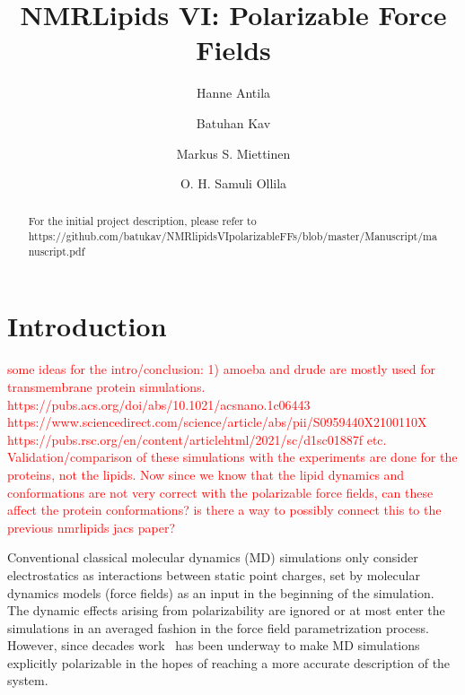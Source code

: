 \documentclass[journal=jacsat,manuscript=article,layout=singlecolumn]{achemso}
\author{Hanne Antila}
\author{Batuhan Kav}
\affiliation{Forschungszentrum Juelich, Germany}
\author{Markus S. Miettinen}
\author{O. H. Samuli Ollila}
\title{NMRLipids VI: Polarizable Force Fields}
\begin{document}


\begin{abstract}
	
	For the initial project description, please refer to \\ https://github.com/batukav/NMRlipidsVIpolarizableFFs/blob/master/Manuscript/manuscript.pdf
	
\end{abstract}

\section{Introduction}

\textcolor{red}{some ideas for the intro/conclusion: 1) amoeba and drude are mostly used for transmembrane protein simulations. https://pubs.acs.org/doi/abs/10.1021/acsnano.1c06443 https://www.sciencedirect.com/science/article/abs/pii/S0959440X2100110X https://pubs.rsc.org/en/content/articlehtml/2021/sc/d1sc01887f etc. Validation/comparison of these simulations with the experiments are done for the proteins, not the lipids. Now since we know that the lipid dynamics and conformations are not very correct with the polarizable force fields, can these affect the protein conformations? is there a way to possibly connect this to the previous nmrlipids jacs paper?\\
}

Conventional classical molecular dynamics (MD) simulations only consider electrostatics as interactions between static point charges, set by molecular dynamics models (force fields) as an input in the beginning of the simulation. The dynamic effects arising from polarizability are ignored or at most enter the simulations in an averaged fashion in the force field parametrization process. However, since decades work~\cite{Thole1981,ando2001stable,Grossfield2003,
lamoreux2003,Antila2013 ,Lemkul2016, baker2015polarizable,jing2019polarizable } has been underway to make MD simulations explicitly polarizable in the hopes of reaching a more accurate description of the system. 
\end{document}
